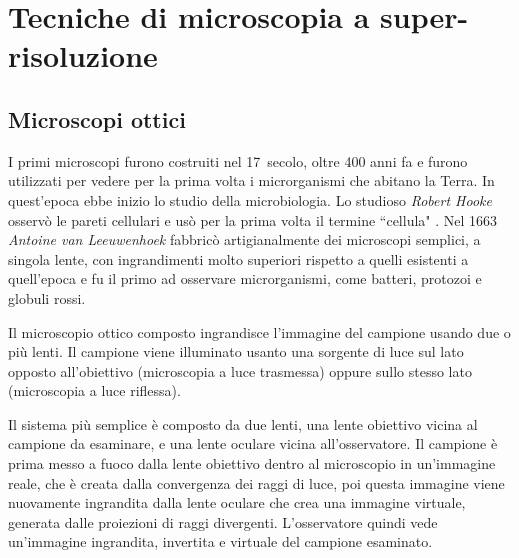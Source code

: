 \documentclass[../main.tex]{subfiles}
\begin{document}
\chapter{Tecniche di microscopia a super-risoluzione}

\section{Microscopi ottici}

I primi microscopi furono costruiti nel 17\textdegree\ secolo, oltre 400 anni fa e furono utilizzati per vedere per la prima volta i microrganismi che abitano la Terra. In quest'epoca ebbe inizio lo studio della \gls{microbiologia}. Lo studioso \textit{Robert Hooke} osservò le pareti cellulari e usò per la prima volta il termine ``cellula" \cite{fara_2009, micrographia}. Nel 1663 \textit{Antoine van Leeuwenhoek} fabbricò artigianalmente dei microscopi semplici, a singola lente, con ingrandimenti molto superiori rispetto a quelli esistenti a quell'epoca e fu il primo ad osservare microrganismi, come batteri, protozoi e globuli rossi.\cite{lane_2015, dobell_1923, corliss_1975, jessup_2024}

Il microscopio ottico composto ingrandisce l'immagine del campione usando due o più lenti. Il campione viene illuminato usanto una sorgente di luce sul lato opposto all'obiettivo (microscopia a luce trasmessa) oppure sullo stesso lato (microscopia a luce riflessa).

Il sistema più semplice è composto da due lenti, una lente obiettivo vicina al campione da esaminare, e una lente oculare vicina all'osservatore. Il campione è prima messo a fuoco dalla lente obiettivo dentro al microscopio in un'immagine reale, che è creata dalla convergenza dei raggi di luce, poi questa immagine viene nuovamente ingrandita dalla lente oculare che crea una immagine virtuale, generata dalle proiezioni di raggi divergenti. L'osservatore quindi vede un'immagine ingrandita, invertita e virtuale del campione esaminato.
\end{document}
